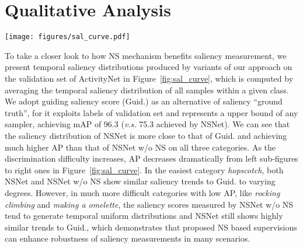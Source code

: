 \documentclass[runningheads]{llncs}
\newcommand{\figref}[1]{Figure~\ref{#1}}
\begin{document}
\section{Qualitative Analysis} \label{appendix:qualitative}
\begin{figure*}[t!]
\centering \texttt{[image: figures/sal\_curve.pdf]}
\caption{\textbf{Measured saliency distribution by different variants of our approach.} We show the average value over all samples for a category for 3 variants, \emph{viz.,} guiding saliency score (Guid.), our approach without non-saliency suppression (Ours w/o NS) and our approach(Ours). Our approach can generate saliency measurements close to Guid. for all 3 categories. However, Ours w/o NS only produce a relatively flat line on difficult categories like \emph{rock climbing} and \emph{making an omelette}, which shows it cannot handle saliency measurement on difficult categories without NS mechansim. Predicted saliency distributions are smoothed by Exponential Moving Average with weight of 0.8 for a better sense of trend.}  
      \label{fig:sal_curve}
\end{figure*}
To take a closer look to how NS mechanism benefits saliency measurement, we present temporal saliency distributions produced by variants of our approach on the validation set of ActivityNet in \figref{fig:sal_curve}, which is computed by averaging the temporal saliency distribution of all samples within a given class. We adopt guiding saliency score (Guid.) as an alternative of saliency ``ground truth'', for it exploits labels of validation set and represents a upper bound of any sampler, achieving mAP of 96.3 (\emph{v.s.} 75.3 achieved by NSNet). 
We can see that the saliency distribution of NSNet is more close to that of Guid. and achieving much higher AP than that of NSNet w/o NS on all three categories. As the discrimination difficulty increases, AP decreases dramatically from left sub-figures to right ones in \figref{fig:sal_curve}. In the easiest category \emph{hopscotch}, both NSNet and NSNet w/o NS show similar saliency trends to Guid. to varying degrees. However, in much more difficult categories with low AP, like \emph{rocking climbing} and \emph{making a omelette}, the saliency scores measured by NSNet w/o NS tend to generate temporal uniform distributions and NSNet still shows highly similar trends to Guid., which demonstrates that proposed NS based supervisions can enhance robustness of saliency measurements in many scenarios.
 

 


\end{document}
